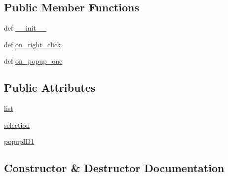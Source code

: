 \subsection*{Public Member Functions}
\begin{DoxyCompactItemize}
\item 
def \hyperlink{class_uni_dec_1_1unidec__modules_1_1_manual_selection_window_1_1_manual_list_ctrl_panel_a08f07027486133ef617d95dc11266040}{\+\_\+\+\_\+init\+\_\+\+\_\+}
\item 
def \hyperlink{class_uni_dec_1_1unidec__modules_1_1_manual_selection_window_1_1_manual_list_ctrl_panel_a7ce9040a66f06aeec8443f55ae49efad}{on\+\_\+right\+\_\+click}
\item 
def \hyperlink{class_uni_dec_1_1unidec__modules_1_1_manual_selection_window_1_1_manual_list_ctrl_panel_a5eea29b9a804e0ab9c57dce8a9dd790f}{on\+\_\+popup\+\_\+one}
\end{DoxyCompactItemize}
\subsection*{Public Attributes}
\begin{DoxyCompactItemize}
\item 
\hyperlink{class_uni_dec_1_1unidec__modules_1_1_manual_selection_window_1_1_manual_list_ctrl_panel_a95e6e9762f5c7ec73968f443706ba8c8}{list}
\item 
\hyperlink{class_uni_dec_1_1unidec__modules_1_1_manual_selection_window_1_1_manual_list_ctrl_panel_a54c1e8ccf97b547a212b752f07ef5afa}{selection}
\item 
\hyperlink{class_uni_dec_1_1unidec__modules_1_1_manual_selection_window_1_1_manual_list_ctrl_panel_aad92dda71ec9301eb1187f0e49c362df}{popup\+I\+D1}
\end{DoxyCompactItemize}


\subsection{Constructor \& Destructor Documentation}
\hypertarget{class_uni_dec_1_1unidec__modules_1_1_manual_selection_window_1_1_manual_list_ctrl_panel_a08f07027486133ef617d95dc11266040}{}
